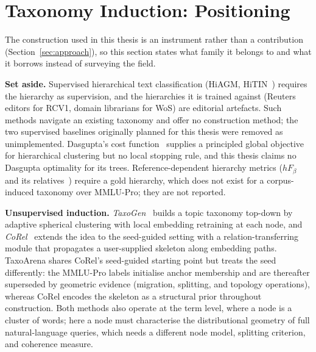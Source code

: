 \section{Taxonomy Induction: Positioning}\label{sec:taxonomy-construction}

The construction used in this thesis is an instrument rather than a
contribution (Section~\ref{sec:approach}), so this section states
what family it belongs to and what it borrows instead of surveying
the field.

\textbf{Set aside.} Supervised hierarchical text classification
(HiAGM, HiTIN~\parencite{zhou2020hiagm, zhu2023hitin}) requires the
hierarchy as supervision, and the hierarchies it is trained against
(Reuters editors for RCV1, domain librarians for WoS) are editorial
artefacts. Such methods navigate an existing taxonomy and offer no
construction method; the two supervised baselines originally planned
for this thesis were removed as unimplemented. Dasgupta's cost
function~\parencite{dasgupta2016cost} supplies a principled global
objective for hierarchical clustering but no local stopping rule, and
this thesis claims no Dasgupta optimality for its trees.
Reference-dependent hierarchy metrics ($h\!F_\beta$ and its
relatives~\parencite{kosmopoulos2015hmetrics}) require a gold
hierarchy, which does not exist for a corpus-induced taxonomy over
MMLU-Pro; they are not reported.

\textbf{Unsupervised induction.}
\textit{TaxoGen}~\parencite{zhang2018taxogen} builds a topic taxonomy
top-down by adaptive spherical clustering with local embedding
retraining at each node, and \textit{CoRel}~\parencite{huang2020corel}
extends the idea to the seed-guided setting with a
relation-transferring module that propagates a user-supplied skeleton
along embedding paths. TaxoArena shares CoRel's seed-guided starting
point but treats the seed differently: the MMLU-Pro labels initialise
anchor membership and are thereafter superseded by geometric evidence
(migration, splitting, and topology operations), whereas CoRel
encodes the skeleton as a structural prior throughout construction.
Both methods also operate at the term level, where a node is a
cluster of words; here a node must characterise the distributional
geometry of full natural-language queries, which needs a different
node model, splitting criterion, and coherence measure.

